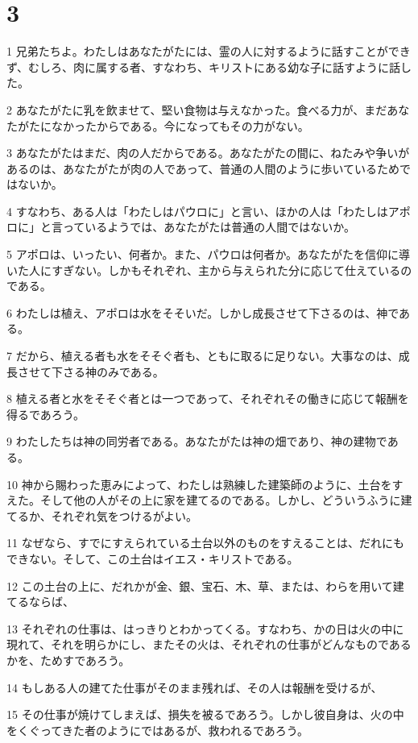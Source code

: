 \chapter{3}

\par 1 兄弟たちよ。わたしはあなたがたには、霊の人に対するように話すことができず、むしろ、肉に属する者、すなわち、キリストにある幼な子に話すように話した。
\par 2 あなたがたに乳を飲ませて、堅い食物は与えなかった。食べる力が、まだあなたがたになかったからである。今になってもその力がない。
\par 3 あなたがたはまだ、肉の人だからである。あなたがたの間に、ねたみや争いがあるのは、あなたがたが肉の人であって、普通の人間のように歩いているためではないか。
\par 4 すなわち、ある人は「わたしはパウロに」と言い、ほかの人は「わたしはアポロに」と言っているようでは、あなたがたは普通の人間ではないか。
\par 5 アポロは、いったい、何者か。また、パウロは何者か。あなたがたを信仰に導いた人にすぎない。しかもそれぞれ、主から与えられた分に応じて仕えているのである。
\par 6 わたしは植え、アポロは水をそそいだ。しかし成長させて下さるのは、神である。
\par 7 だから、植える者も水をそそぐ者も、ともに取るに足りない。大事なのは、成長させて下さる神のみである。
\par 8 植える者と水をそそぐ者とは一つであって、それぞれその働きに応じて報酬を得るであろう。
\par 9 わたしたちは神の同労者である。あなたがたは神の畑であり、神の建物である。
\par 10 神から賜わった恵みによって、わたしは熟練した建築師のように、土台をすえた。そして他の人がその上に家を建てるのである。しかし、どういうふうに建てるか、それぞれ気をつけるがよい。
\par 11 なぜなら、すでにすえられている土台以外のものをすえることは、だれにもできない。そして、この土台はイエス・キリストである。
\par 12 この土台の上に、だれかが金、銀、宝石、木、草、または、わらを用いて建てるならば、
\par 13 それぞれの仕事は、はっきりとわかってくる。すなわち、かの日は火の中に現れて、それを明らかにし、またその火は、それぞれの仕事がどんなものであるかを、ためすであろう。
\par 14 もしある人の建てた仕事がそのまま残れば、その人は報酬を受けるが、
\par 15 その仕事が焼けてしまえば、損失を被るであろう。しかし彼自身は、火の中をくぐってきた者のようにではあるが、救われるであろう。
